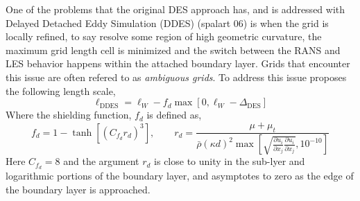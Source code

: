\documentclass[12pt,letterpaper]{article}
\begin{document}
One of the problems that the original DES approach has, and is addressed with Delayed Detached Eddy Simulation (DDES) (spalart 06) is when the grid is locally refined, to say resolve some region of high geometric curvature, the maximum grid length cell is minimized and the switch between the RANS and LES behavior happens within the attached boundary layer. Grids that encounter this issue are often refered to as \emph{ambiguous grids}. To address this issue proposes the following length scale, 
\begin{equation}
    \ell_{\text{DDES}} = \ell_{W} - f_d \max\left[0, \ell_{W} - \Delta_{\text{DES}} \right]
\end{equation}
    Where the shielding function, $f_d$ is defined as, 
    \begin{equation}
f_d = 1 - \tanh\left[ (C_{f_d} r_d)^3 \right], \qquad r_d = \frac{\mu + \mu_t}{\bar{\rho} (\kappa d)^2 \max \left[ \sqrt{\frac{\partial u_i}{\partial x_j} \frac{\partial u_i}{\partial x_j}} , 10^{-10} \right]}
    \end{equation}
    Here $C_{f_d} = 8$ and the argument $r_d$ is close to unity in the sub-lyer and logarithmic portions of the boundary layer, and asymptotes to zero as the edge of the boundary layer is approached.
    
\end{document}
